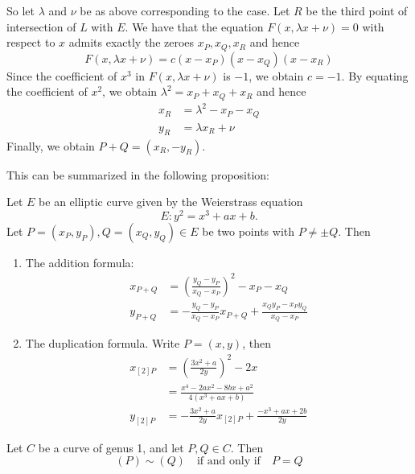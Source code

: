 So let $\lambda$ and $\nu$ be as above corresponding to the case.
Let $R$ be the third point of intersection of $L$ with $E$.
We have that the equation $F(x, \lambda x + \nu) = 0$ with respect to $x$
admits exactly the zeroes $x_P, x_Q, x_R$ and hence
\begin{equation*}
	F(x, \lambda x + \nu) = c(x - x_P)(x - x_Q)(x - x_R)
\end{equation*}
Since the coefficient of $x^3$ in $F(x, \lambda x + \nu)$ is $-1$, we obtain
$c = -1$. By equating the coefficient of $x^2$, we obtain
$\lambda^2 = x_P + x_Q + x_R$ and hence
\begin{align*}
	x_R &= \lambda^2 - x_P - x_Q\\
	y_R &= \lambda x_R + \nu
\end{align*}
Finally, we obtain $P + Q = (x_R, -y_R)$.

This can be summarized in the following proposition:
\begin{proposition}
	Let $E$ be an elliptic curve given by the Weierstrass equation
	\begin{equation*}
		E: y^2 = x^3 + ax + b.
	\end{equation*}
	Let $P = (x_P, y_P), Q = (x_Q, y_Q) \in E$ be two points with $P \neq \pm Q$.
	Then 
	\begin{enumerate}
		\item The addition formula:
			\begin{align*}
				x_{P + Q} &= \left( \frac{y_Q - y_P}{x_Q - x_P} \right)^2
				- x_P - x_Q\\
				y_{P + Q} &= -\frac{y_Q - y_P}{x_Q - x_P}x_{P+Q} + \frac{x_Qy_P -
				x_Py_Q}{x_Q - x_P}
			\end{align*}
		\item The duplication formula. Write $P = (x, y)$, then
			\begin{align*}
				x_{[2]P} &= \left( \frac{3x^2 + a}{2y} \right)^2
				- 2x\\
				&= \frac{x^4 - 2ax^2 - 8bx + a^2}{4(x^3 + ax + b)}\\
				y_{[2]P} &= - \frac{3x^2 + a}{2y}x_{[2]P}
				+ \frac{-x^3 + ax + 2b}{2y}
			\end{align*}
	\end{enumerate}
\end{proposition}


\begin{lemma}
	\label{lem:sim-implies-eq}
	Let $C$ be a curve of genus 1, and let $P, Q \in C$. Then
	\begin{equation*}
		(P) \sim (Q)
		\quad\textrm{if and only if}\quad
		P = Q
	\end{equation*}
\end{lemma}


